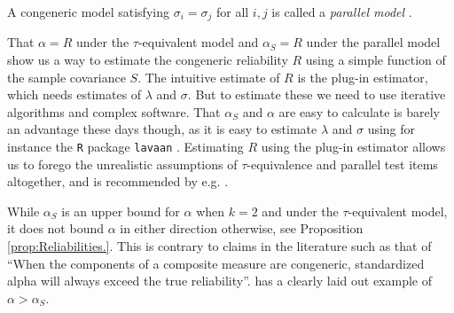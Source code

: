 \documentclass[twoside]{article}
\begin{document}
A congeneric model satisfying $\sigma_{i}=\sigma_{j}$ for all $i,j$ is called a \textit{parallel model} \citep[][section 2.13]{Lord1968-ax}. 

That $\alpha = R$ under the $\tau$-equivalent model and $\alpha_S = R$ under the parallel model show us a way to estimate the congeneric reliability $R$ using a simple function of the sample covariance $S$. The intuitive estimate of $R$ is the plug-in estimator, which needs estimates of $\lambda$ and $\sigma$. But to estimate these we need to use iterative algorithms and complex software. That $\alpha_S$ and $\alpha$ are easy to calculate is barely an advantage these days though, as it is easy to estimate $\lambda$ and $\sigma$ using for instance the \texttt{R} \citep{Team2013-tt} package \texttt{lavaan} \citep{Rosseel2012-yg}. Estimating $R$ using the plug-in estimator allows us to forego the unrealistic assumptions of $\tau$-equivalence and parallel test items altogether, and is recommended by e.g. \citet{McNeish2019-ea}.

\begin{rem}
While $\alpha_S$ is an upper bound for $\alpha$ when $k = 2$ and under the $\tau$-equivalent model, it does not bound $\alpha$ in either direction otherwise, see Proposition \ref{prop:Reliabilities.}. This is contrary to claims in the literature such as that of \citet[][p.348]{Osburn2000-jd} \enquote{When the components of a composite measure are congeneric, standardized alpha will always exceed the true reliability}. \citet[][p.450]{Falk2011-ae} has a clearly laid out example of $\alpha>\alpha_S$.
\end{rem}
\end{document}
